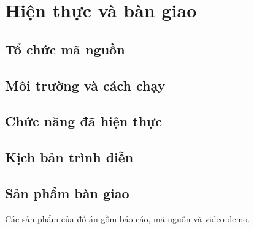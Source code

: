 \section{Hiện thực và bàn giao}
\label{sec:implementation}

\subsection{Tổ chức mã nguồn}
\par\noindent\mbox{}\par\vspace{2mm}

\subsection{Môi trường và cách chạy}
\par\noindent\mbox{}\par\vspace{2mm}

\subsection{Chức năng đã hiện thực}
\par\noindent\mbox{}\par\vspace{2mm}

\subsection{Kịch bản trình diễn}
\par\noindent\mbox{}\par\vspace{2mm}

\subsection{Sản phẩm bàn giao}
Các sản phẩm của đồ án gồm báo cáo, mã nguồn và video demo.
\par\noindent\mbox{}\par\vspace{2mm}
